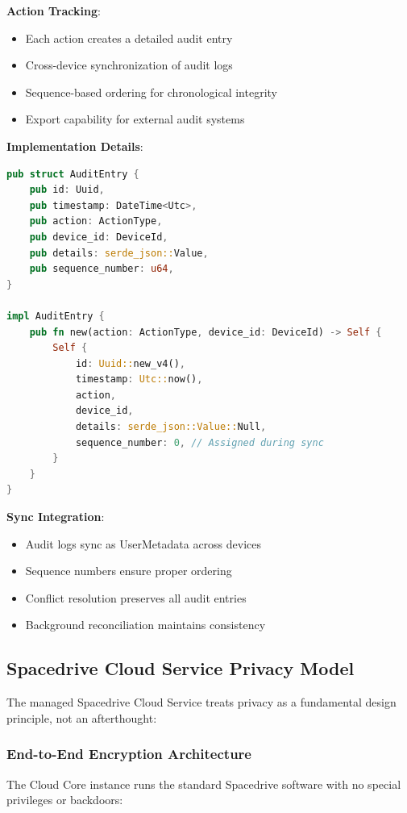 \documentclass[sigconf]{acmart}
\begin{document}
\textbf{Action Tracking}:
\begin{itemize}[noitemsep, topsep=0pt]
\item Each action creates a detailed audit entry
\item Cross-device synchronization of audit logs
\item Sequence-based ordering for chronological integrity
\item Export capability for external audit systems
\end{itemize}

\textbf{Implementation Details}:
\begin{lstlisting}[language=Rust, caption={Audit log entry structure}]
pub struct AuditEntry {
    pub id: Uuid,
    pub timestamp: DateTime<Utc>,
    pub action: ActionType,
    pub device_id: DeviceId,
    pub details: serde_json::Value,
    pub sequence_number: u64,
}

impl AuditEntry {
    pub fn new(action: ActionType, device_id: DeviceId) -> Self {
        Self {
            id: Uuid::new_v4(),
            timestamp: Utc::now(),
            action,
            device_id,
            details: serde_json::Value::Null,
            sequence_number: 0, // Assigned during sync
        }
    }
}
\end{lstlisting}

\textbf{Sync Integration}:
\begin{itemize}[noitemsep, topsep=0pt]
\item Audit logs sync as UserMetadata across devices
\item Sequence numbers ensure proper ordering
\item Conflict resolution preserves all audit entries
\item Background reconciliation maintains consistency
\end{itemize}

\subsection{Spacedrive Cloud Service Privacy Model}
The managed Spacedrive Cloud Service treats privacy as a fundamental design principle, not an afterthought:

\subsubsection{End-to-End Encryption Architecture}
The Cloud Core instance runs the standard Spacedrive software with no special privileges or backdoors:
\end{document}
